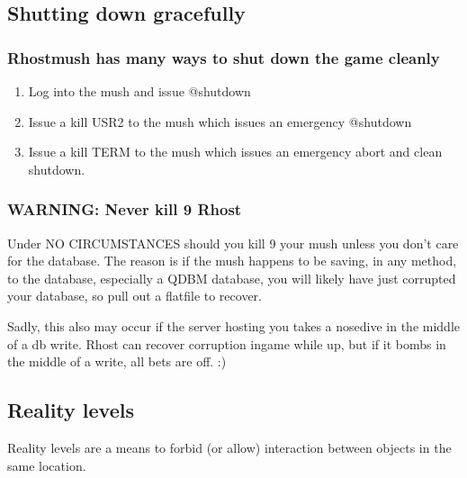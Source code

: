 \documentclass[letterpaper,10pt,english]{sphinxmanual}
\begin{document}
\subsection{Shutting down gracefully}
\label{\detokenize{advanced:shutting-down-gracefully}}

\subsubsection{Rhostmush has many ways to shut down the game cleanly}
\label{\detokenize{advanced:rhostmush-has-many-ways-to-shut-down-the-game-cleanly}}\begin{enumerate}
%
\item {} 
\sphinxAtStartPar
Log into the mush and issue @shutdown

\item {} 
\sphinxAtStartPar
Issue a kill \sphinxhyphen{}USR2 to the mush which issues an emergency @shutdown

\item {} 
\sphinxAtStartPar
Issue a kill \sphinxhyphen{}TERM to the mush which issues an emergency abort and clean shutdown.

\end{enumerate}


\subsubsection{WARNING: Never kill \sphinxhyphen{}9 Rhost}
\label{\detokenize{advanced:warning-never-kill-9-rhost}}
\sphinxAtStartPar
Under NO CIRCUMSTANCES should you kill \sphinxhyphen{}9 your mush unless you don’t care for the
database.  The reason is if the mush happens to be saving, in any method, to the
database, especially a QDBM database, you will likely have just corrupted your
database, so pull out a flatfile to recover.

\sphinxAtStartPar
Sadly, this also may occur if the server hosting you takes a nose\sphinxhyphen{}dive in the middle
of a db write.  Rhost can recover corruption in\sphinxhyphen{}game while up, but if it bombs
in the middle of a write, all bets are off. :)


\subsection{Reality levels}
\label{\detokenize{advanced:reality-levels}}
\sphinxAtStartPar
Reality levels are a means to forbid (or allow) interaction between objects
in the same location.
\end{document}
